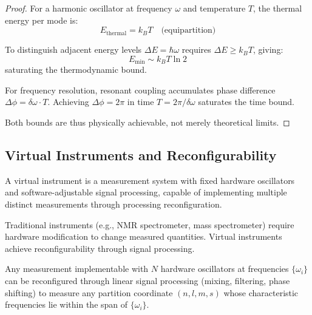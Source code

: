 \begin{proof}
For a harmonic oscillator at frequency $\omega$ and temperature $T$, the thermal energy per mode is:
\begin{equation}
E_{\text{thermal}} = k_B T \quad \text{(equipartition)}
\end{equation}

To distinguish adjacent energy levels $\Delta E = \hbar\omega$ requires $\Delta E \geq k_B T$, giving:
\begin{equation}
E_{\min} \sim k_B T \ln 2
\end{equation}
saturating the thermodynamic bound.

For frequency resolution, resonant coupling accumulates phase difference $\Delta\phi = \delta\omega \cdot T$. Achieving $\Delta\phi = 2\pi$ in time $T = 2\pi/\delta\omega$ saturates the time bound.

Both bounds are thus physically achievable, not merely theoretical limits.
\end{proof}

\subsection{Virtual Instruments and Reconfigurability}

\begin{definition}
\label{def:virtual_instrument}
A virtual instrument is a measurement system with fixed hardware oscillators and software-adjustable signal processing, capable of implementing multiple distinct measurements through processing reconfiguration.
\end{definition}

Traditional instruments (e.g., NMR spectrometer, mass spectrometer) require hardware modification to change measured quantities. Virtual instruments achieve reconfigurability through signal processing.

\begin{theorem}
\label{thm:reconfigurability}
Any measurement implementable with $N$ hardware oscillators at frequencies $\{\omega_i\}$ can be reconfigured through linear signal processing (mixing, filtering, phase shifting) to measure any partition coordinate $(n,l,m,s)$ whose characteristic frequencies lie within the span of $\{\omega_i\}$.
\end{theorem}

